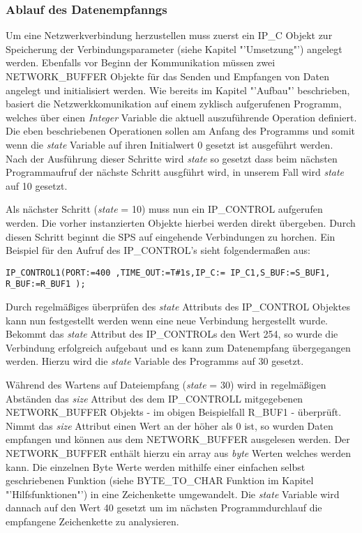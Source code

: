 \subsubsection{Ablauf des Datenempfanngs}

Um eine Netzwerkverbindung herzustellen muss zuerst ein IP\_C Objekt zur Speicherung der Verbindungsparameter (siehe Kapitel "'Umsetzung"') angelegt werden.
Ebenfalls vor Beginn der Kommunikation müssen zwei NETWORK\_BUFFER Objekte für das Senden und Empfangen von Daten angelegt und initialisiert werden. 
Wie bereits im Kapitel "'Aufbau"' beschrieben, basiert die Netzwerkkomunikation auf einem zyklisch aufgerufenen Programm, welches über einen \textit{Integer} Variable die aktuell auszuführende Operation definiert. Die eben beschriebenen Operationen sollen am Anfang des Programms und somit wenn die \textit {state} Variable auf ihren Initialwert 0 gesetzt ist ausgeführt werden. Nach der Ausführung dieser Schritte wird \textit {state} so gesetzt dass beim nächsten Programmaufruf der nächste Schritt ausgführt wird, in unserem Fall wird \textit{state} auf 10 gesetzt.

Als nächster Schritt (\textit{state} = 10) muss nun ein  IP\_CONTROL aufgerufen werden. Die vorher instanzierten Objekte hierbei werden direkt übergeben. Durch diesen Schritt beginnt die SPS auf eingehende Verbindungen zu horchen.
Ein Beispiel für den Aufruf des IP\_CONTROL's sieht folgendermaßen aus:
\begin{lstlisting}[language = codesysls, captionpos=b, caption={Resetten einer Motors}]
IP_CONTROL1(PORT:=400 ,TIME_OUT:=T#1s,IP_C:= IP_C1,S_BUF:=S_BUF1, R_BUF:=R_BUF1 );
\end{lstlisting}
Durch regelmäßiges überprüfen des \textit{state} Attributs des IP\_CONTROL Objektes kann nun festgestellt werden wenn eine neue Verbindung hergestellt wurde. Bekommt das \textit{state} Attribut des IP\_CONTROLs den Wert 254, so wurde die Verbindung erfolgreich aufgebaut und es kann zum Datenempfang übergegangen werden. Hierzu wird die \textit{state} Variable des Programms auf 30 gesetzt.

Während des Wartens auf Dateiempfang (\textit{state} = 30) wird in regelmäßigen Abständen das \textit{size} Attribut des dem IP\_CONTROLL mitgegebenen NETWORK\_BUFFER Objekts - im obigen Beispielfall R\_BUF1 - überprüft. Nimmt das \textit{size} Attribut einen Wert an der höher als 0 ist, so wurden Daten empfangen und können aus dem NETWORK\_BUFFER ausgelesen werden. Der NETWORK\_BUFFER enthält hierzu ein array aus \textit{byte} Werten welches werden kann. Die einzelnen Byte Werte werden mithilfe einer einfachen selbst geschriebenen Funktion (siehe BYTE\_TO\_CHAR Funktion im Kapitel "'Hilfsfunktionen"') in eine Zeichenkette umgewandelt. Die \textit{state} Variable wird dannach auf den Wert 40 gesetzt um im nächsten Programmdurchlauf die empfangene Zeichenkette zu analysieren.

